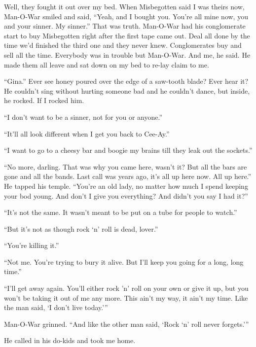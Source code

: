 Well, they fought it out over my bed. When Misbegotten said I was theirs now, Man-O-War smiled and said, ``Yeah, and I bought you. You're all mine now, you and your sinner. My sinner.'' That was truth. Man-O-War had his conglomerate start to buy Misbegotten right after the first tape came out. Deal all done by the time we'd finished the third one and they never knew. Conglomerates buy and sell all the time. Everybody was in trouble but Man-O-War. And me, he said. He made them all leave and sat down on my bed to re-lay claim to me.

``Gina.'' Ever see honey poured over the edge of a saw-tooth blade? Ever hear it? He couldn't sing without hurting someone bad and he couldn't dance, but inside, he rocked. If I rocked him.

``I don't want to be a sinner, not for you or anyone.''

``It'll all look different when I get you back to Cee-Ay.''

``I want to go to a cheesy bar and boogie my brains till they leak out the sockets.''

``No more, darling. That was why you came here, wasn't it? But all the bars are gone and all the bands. Last call was years ago, it's all up here now. All up here.'' He tapped his temple. ``You're an old lady, no matter how much I spend keeping your bod young. And don't I give you everything? And didn't you say I had it?''

``It's not the same. It wasn't meant to be put on a tube for people to watch.''

``But it's not as though rock `n' roll is dead, lover.''

``You're killing it.''

``Not me. You're trying to bury it alive. But I'll keep you going for a long, long time.''

``I'll get away again. You'll either rock 'n' roll on your own or give it up, but you won't be taking it out of me any more. This ain't my way, it ain't my time. Like the man said, `I don't live today.'''

Man-O-War grinned. ``And like the other man said, `Rock `n' roll never forgets.'''

He called in his do-kids and took me home.
